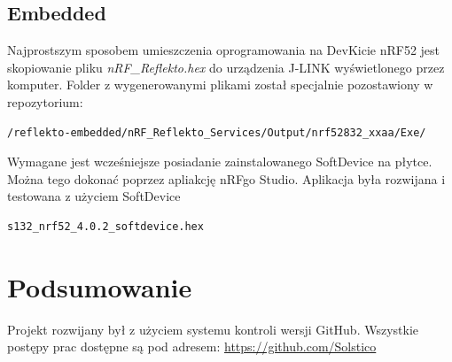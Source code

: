 \documentclass[a4paper,11pt]{article}
\begin{document}
\subsection{Embedded}
Najprostszym sposobem umieszczenia oprogramowania na DevKicie nRF52 jest skopiowanie pliku \textit{nRF\_Reflekto.hex} do urządzenia J-LINK wyświetlonego przez komputer. Folder z wygenerowanymi plikami został specjalnie pozostawiony w repozytorium: \begin{lstlisting}
/reflekto-embedded/nRF_Reflekto_Services/Output/nrf52832_xxaa/Exe/
\end{lstlisting} 
Wymagane jest wcześniejsze posiadanie zainstalowanego SoftDevice na płytce. Można tego dokonać poprzez apliakcję nRFgo Studio. Aplikacja była rozwijana i testowana z użyciem SoftDevice
\begin{lstlisting}
s132_nrf52_4.0.2_softdevice.hex
\end{lstlisting}

	
\section{Podsumowanie}
Projekt rozwijany był z użyciem systemu kontroli wersji GitHub. Wszystkie postępy prac dostępne są pod adresem: \url{https://github.com/Solstico}
	
	
\end{document}
